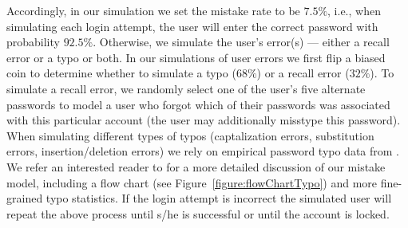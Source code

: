 Accordingly, in our simulation we set the mistake rate to be $7.5\%$, i.e., when simulating each login attempt, the user will enter the correct password with probability $92.5\%$. Otherwise, we simulate the user's error(s) --- either a recall error or a typo or both. In our simulations of user errors we first flip a biased coin to determine whether to simulate a typo ($68\%$) or a recall error ($32\%$). To simulate a recall error, we randomly select one of the user's five alternate passwords to model a user who forgot which of their passwords was associated with this particular account (the user may additionally misstype this password). When simulating different types of typos (captalization errors, substitution errors, insertion/deletion errors) we rely on empirical password typo data from  \cite{SP:CAAJR16,CCS:CWPCR17}.   We refer an interested reader to  for a more detailed discussion of our mistake model, including a flow chart (see Figure~\ref{figure:flowChartTypo}) and more fine-grained typo statistics. If the login attempt is incorrect the simulated user will repeat the above process until s/he is successful or until the account is locked.




